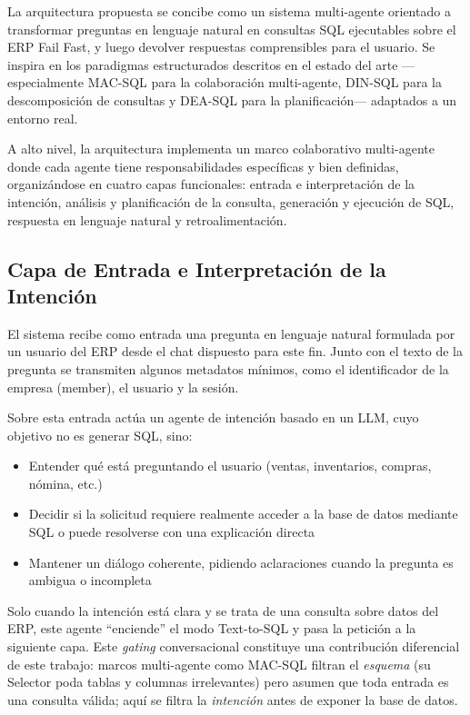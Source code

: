 \documentclass[journal]{IEEEtran}
\begin{document}
La arquitectura propuesta se concibe como un sistema multi-agente orientado a transformar preguntas en lenguaje natural en consultas SQL ejecutables sobre el ERP Fail Fast, y luego devolver respuestas comprensibles para el usuario. Se inspira en los paradigmas estructurados descritos en el estado del arte —especialmente MAC-SQL para la colaboración multi-agente, DIN-SQL para la descomposición de consultas y DEA-SQL para la planificación— adaptados a un entorno real.

A alto nivel, la arquitectura implementa un marco colaborativo multi-agente donde cada agente tiene responsabilidades específicas y bien definidas, organizándose en cuatro capas funcionales: entrada e interpretación de la intención, análisis y planificación de la consulta, generación y ejecución de SQL, respuesta en lenguaje natural y retroalimentación.


\subsection{Capa de Entrada e Interpretación de la Intención}

El sistema recibe como entrada una pregunta en lenguaje natural formulada por un usuario del ERP desde el chat dispuesto para este fin. Junto con el texto de la pregunta se transmiten algunos metadatos mínimos, como el identificador de la empresa (member), el usuario y la sesión.

Sobre esta entrada actúa un agente de intención basado en un LLM, cuyo objetivo no es generar SQL, sino:
\begin{itemize}
	\item Entender qué está preguntando el usuario (ventas, inventarios, compras, nómina, etc.)
	\item Decidir si la solicitud requiere realmente acceder a la base de datos mediante SQL o puede resolverse con una explicación directa
	\item Mantener un diálogo coherente, pidiendo aclaraciones cuando la pregunta es ambigua o incompleta
\end{itemize}

Solo cuando la intención está clara y se trata de una consulta sobre datos del ERP, este agente ``enciende'' el modo Text-to-SQL y pasa la petición a la siguiente capa. Este \emph{gating} conversacional constituye una contribución diferencial de este trabajo: marcos multi-agente como MAC-SQL \cite{wang2025mac} filtran el \emph{esquema} (su Selector poda tablas y columnas irrelevantes) pero asumen que toda entrada es una consulta válida; aquí se filtra la \emph{intención} antes de exponer la base de datos.
\end{document}
